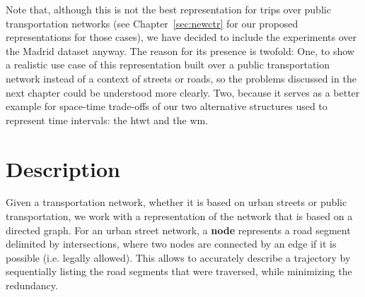 	Note that, although this is not the best representation for trips over public transportation networks (see Chapter~\ref{sec:newctr} for our proposed representations for those cases), we have decided to include the experiments over the Madrid dataset anyway. The reason for its presence is twofold: One, to show a realistic use case of this representation built over a public transportation network instead of a context of streets or roads, so the problems discussed in the next chapter could be understood more clearly. Two, because it serves as a better example for \mbox{space-time} \mbox{trade-offs} of our two alternative structures used to represent time intervals: the \gls{htwt} and the \gls{wm}.

\section{Description}
\label{sec:ctr:desc}
    Given a transportation network, whether it is based on urban streets or public transportation, we work with a representation of the network that is based on a directed graph. For an urban street network, a \textbf{node} represents a road segment delimited by intersections, where two nodes are connected by an edge if it is possible (i.e. legally allowed). This allows to accurately describe a trajectory by sequentially listing the road segments that were traversed, while minimizing the redundancy.

	
